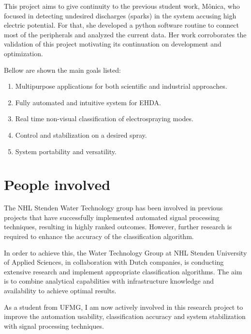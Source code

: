 This project aims to give continuity to the previous student work\cite{Monica}, 
Mônica, who focused in detecting undesired discharges (sparks) in the system accusing high electric potential. 
For that, she developed a python software routine to connect most of the peripherals and analyzed the current data.
Her work corroborates the validation of this project motivating its continuation on development and optimization.

Bellow are shown the main goals listed:

\begin{enumerate}[]
\item Multipurpose applications for both scientific and industrial approaches.
\item Fully automated and intuitive system for EHDA.
\item Real time non-visual classification of electrospraying modes.
\item Control and stabilization on a desired spray. 
\item System portability and versatility.
\end{enumerate}


\section{People involved}
\label{sec:companies}


The NHL Stenden Water Technology group has been involved in previous projects that have successfully implemented automated signal processing techniques, resulting in highly ranked outcomes. 
However, further research is required to enhance the accuracy of the classification algorithm. 

In order to achieve this, the Water Technology Group at NHL Stenden University of Applied Sciences, in collaboration with Dutch companies, is conducting extensive research and implement appropriate classification algorithms. The aim is to combine analytical capabilities with infrastructure knowledge and availability to achieve optimal results.

As a student from UFMG, I am now actively involved in this research project to improve the automation usability, classification accuracy and system stabilization with signal processing techniques.


